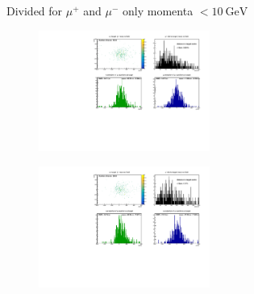 \begin{frame}[t]{Divided for $\mu^+$ and $\mu^-$ only momenta $< \SI{10}{\giga\electronvolt}$}
  \begin{multicols}{2}
    \begin{figure}
      \centering
      \includegraphics[width=0.5\textwidth]{../hists/nofield/p/target_dist_amu.pdf}
    \end{figure}
    \columnbreak
    \begin{figure}
      \centering
      \includegraphics[width=0.5\textwidth]{../hists/nofield/p/target_dist_mu.pdf}
    \end{figure}
  \end{multicols}
\end{frame}


